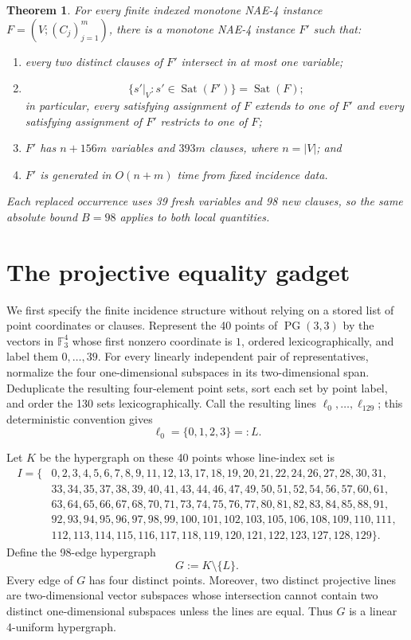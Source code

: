 \documentclass[11pt]{article}
\newtheorem{theorem}{Theorem}
\theoremstyle{definition}
\newcommand{\Sat}{\operatorname{Sat}}
\newcommand{\Fthree}{\mathbb F_{3}}
\begin{document}
\begin{theorem}\label{thm:main}
For every finite indexed monotone NAE-4 instance
$F=(V;(C_j)_{j=1}^{m})$, there is a monotone NAE-4 instance $F'$ such that:
\begin{enumerate}[label=\textup{(\roman*)}]
  \item every two distinct clauses of $F'$ intersect in at most one variable;
  \item
  \[
     \{s'|_V:s'\in\Sat(F')\}=\Sat(F);
  \]
  in particular, every satisfying assignment of $F$ extends to one of $F'$
  and every satisfying assignment of $F'$ restricts to one of $F$;
  \item $F'$ has $n+156m$ variables and $393m$ clauses, where $n=|V|$;
  and
  \item $F'$ is generated in $O(n+m)$ time from fixed incidence data.
\end{enumerate}
Each replaced occurrence uses 39 fresh variables and 98 new clauses, so the
same absolute bound $B=98$ applies to both local quantities.
\end{theorem}

\section{The projective equality gadget}

We first specify the finite incidence structure without relying on a stored
list of point coordinates or clauses.  Represent the 40 points of
$\operatorname{PG}(3,3)$ by the vectors in $\Fthree^4$ whose first nonzero
coordinate is $1$, ordered lexicographically, and label them $0,\ldots,39$.
For every linearly independent pair of representatives, normalize the four
one-dimensional subspaces in its two-dimensional span.  Deduplicate the
resulting four-element point sets, sort each set by point label, and order the
130 sets lexicographically.  Call the resulting lines
$\ell_0,\ldots,\ell_{129}$; this deterministic convention gives
\[
  \ell_0=\{0,1,2,3\}=:L.
\]

Let $K$ be the hypergraph on these 40 points whose line-index set is
\begingroup\small
\begin{align*}
I=\{&0,2,3,4,5,6,7,8,9,11,12,13,17,18,19,20,21,22,24,26,27,28,30,31,\\
&33,34,35,37,38,39,40,41,43,44,46,47,49,50,51,52,54,56,57,60,61,\\
&63,64,65,66,67,68,70,71,73,74,75,76,77,80,81,82,83,84,85,88,91,\\
&92,93,94,95,96,97,98,99,100,101,102,103,105,106,108,109,110,111,\\
&112,113,114,115,116,117,118,119,120,121,122,123,127,128,129\}.
\end{align*}
\endgroup
Define the 98-edge hypergraph
\[
   G:=K\setminus\{L\}.
\]
Every edge of $G$ has four distinct points.  Moreover, two distinct
projective lines are two-dimensional vector subspaces whose intersection
cannot contain two distinct one-dimensional subspaces unless the lines are
equal.  Thus $G$ is a linear 4-uniform hypergraph.
\end{document}
